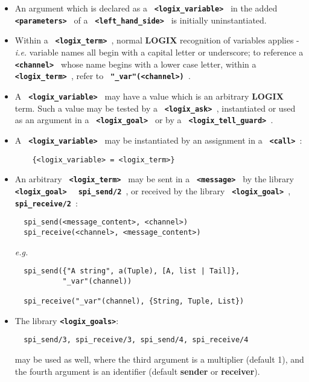 \documentclass[twoside,10pt]{report}
\begin{document}
\begin{itemize}
\item
An argument which is declared as a {\bf \verb+ <logix_variable> +}
in the added {\bf \verb+ <parameters> +} of a
{\bf \verb+ <left_hand_side> +} is initially uninstantiated.

\item
Within a {\bf \verb+ <logix_term> +}, normal {\bf LOGIX} recognition of
variables applies - {\em i.e.} variable names all begin with a capital letter
or underscore; to reference a {\bf \verb+ <channel> +} whose name begins
with a lower case letter, within a {\bf \verb+ <logix_term> +}, refer to
{\bf \verb+ "_var"(<channel>) +}.


\item
A {\bf \verb+ <logix_variable> +} may have a value which is an arbitrary
{\bf LOGIX} term.
Such a value may be tested by a {\bf \verb+ <logix_ask> +},
instantiated or used as an argument in a
{\bf \verb+ <logix_goal> +} or by a
\newline
{\bf \verb+ <logix_tell_guard> +}.

\item
A {\bf \verb+ <logix_variable> +} may be instantiated by an assignment
in a
\newline
{\bf \verb+ <call> +}:

\begin{verbatim}
    {<logix_variable> = <logix_term>}
\end{verbatim}

\item An
arbitrary  {\bf \verb+ <logix_term> +} may be sent in a
{\bf \verb+ <message> +} by the library {\bf \verb+ <logix_goal> +}
{\bf \verb+ spi_send/2 +}, or received by the
library
\newline
{\bf \verb+ <logix_goal> +}, {\bf \verb+ spi_receive/2 +}:

\begin{verbatim}
  spi_send(<message_content>, <channel>)
  spi_receive(<channel>, <message_content>)
\end{verbatim}

\newpage
\noindent
{\em e.g.}

\begin{verbatim}
  spi_send({"A string", a(Tuple), [A, list | Tail]},
           "_var"(channel))

  spi_receive("_var"(channel), {String, Tuple, List})
\end{verbatim}

\item
The library {\bfseries \verb+<logix_goals>+}:
\begin{verbatim}
  spi_send/3, spi_receive/3, spi_send/4, spi_receive/4
\end{verbatim}
may be used as well, where the third argument is a multiplier (default 1), and
the fourth argument is an identifier (default {\bf sender} or {\bf receiver}).


\end{itemize}
\end{document}
